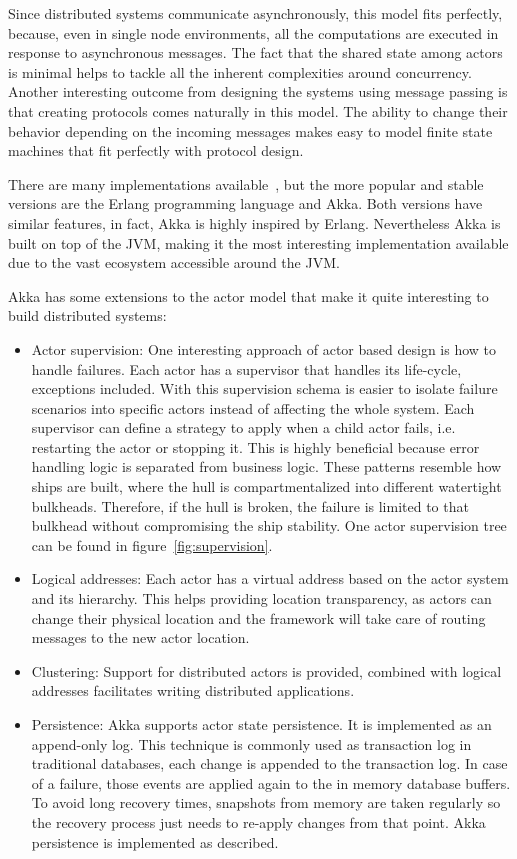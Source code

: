 Since distributed systems communicate asynchronously, this model fits perfectly,
because, even in single node environments, all the computations are executed in
response to asynchronous messages. The fact that the shared state among actors
is minimal helps to tackle all the inherent complexities around concurrency.
Another interesting outcome from designing the systems using message passing is
that creating protocols comes naturally in this model. The ability to change
their behavior depending on the incoming messages makes easy to model finite
state machines that fit perfectly with protocol design.

There are many implementations available~\cite{wikiactor}, but the more popular
and stable versions are the Erlang programming language and Akka. Both versions
have similar features, in fact, Akka is highly inspired by Erlang. Nevertheless
Akka is built on top of the \ac{JVM}, making it the most interesting implementation
available due to the vast ecosystem accessible around the \acs{JVM}.

Akka has some extensions to the actor model that make it quite interesting to
build distributed systems:
%
\begin{itemize}
\item Actor supervision: One interesting approach of actor based design is how
  to handle failures. Each actor has a supervisor that handles its life-cycle,
  exceptions included. With this supervision schema is easier to isolate failure
  scenarios into specific actors instead of affecting the whole system. Each
  supervisor can define a strategy to apply when a child actor fails, i.e.
  restarting the actor or stopping it. This is highly beneficial because error
  handling logic is separated from business logic. These patterns resemble how
  ships are built, where the hull is compartmentalized into different watertight
  bulkheads. Therefore, if the hull is broken, the failure is limited to that
  bulkhead without compromising the ship stability. One actor supervision
  tree can be found in figure~\ref{fig:supervision}.
\item Logical addresses: Each actor has a virtual address based on the actor
  system and its hierarchy. This helps providing location transparency, as
  actors can change their physical location and the framework will take care of
  routing messages to the new actor location.
\item Clustering: Support for distributed actors is provided, combined with
  logical addresses facilitates writing distributed applications.
\item Persistence: Akka supports actor state persistence. It is implemented as
  an append-only log. This technique is commonly used as transaction log in
  traditional databases, each change is appended to the transaction log. In case
  of a failure, those events are applied again to the in memory database
  buffers. To avoid long recovery times, snapshots from memory are taken
  regularly so the recovery process just needs to re-apply changes from that
  point. Akka persistence is implemented as described.
\end{itemize}

